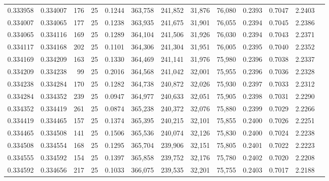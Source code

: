 \begin{tabular}{rrrrrrrrrrrrr}
0.333958 & 0.334007 &   176 &  25 &                                     0.1244 & 363,758 & 241,852 &  31,876 &  76,080 & 0.2393 & 0.7047 & 2.2403 \\
0.334007 & 0.334065 &   177 &  25 &                                     0.1238 & 363,935 & 241,675 &  31,901 &  76,055 & 0.2394 & 0.7045 & 2.2386 \\
0.334065 & 0.334116 &   169 &  25 &                                     0.1289 & 364,104 & 241,506 &  31,926 &  76,030 & 0.2394 & 0.7043 & 2.2371 \\
0.334117 & 0.334168 &   202 &  25 &                                     0.1101 & 364,306 & 241,304 &  31,951 &  76,005 & 0.2395 & 0.7040 & 2.2352 \\
0.334169 & 0.334209 &   163 &  25 &                                     0.1330 & 364,469 & 241,141 &  31,976 &  75,980 & 0.2396 & 0.7038 & 2.2337 \\
0.334209 & 0.334238 &    99 &  25 &                                     0.2016 & 364,568 & 241,042 &  32,001 &  75,955 & 0.2396 & 0.7036 & 2.2328 \\
0.334238 & 0.334284 &   170 &  25 &                                     0.1282 & 364,738 & 240,872 &  32,026 &  75,930 & 0.2397 & 0.7033 & 2.2312 \\
0.334284 & 0.334352 &   239 &  25 &                                     0.0947 & 364,977 & 240,633 &  32,051 &  75,905 & 0.2398 & 0.7031 & 2.2290 \\
0.334352 & 0.334419 &   261 &  25 &                                     0.0874 & 365,238 & 240,372 &  32,076 &  75,880 & 0.2399 & 0.7029 & 2.2266 \\
0.334419 & 0.334465 &   157 &  25 &                                     0.1374 & 365,395 & 240,215 &  32,101 &  75,855 & 0.2400 & 0.7026 & 2.2251 \\
0.334465 & 0.334508 &   141 &  25 &                                     0.1506 & 365,536 & 240,074 &  32,126 &  75,830 & 0.2400 & 0.7024 & 2.2238 \\
0.334508 & 0.334554 &   168 &  25 &                                     0.1295 & 365,704 & 239,906 &  32,151 &  75,805 & 0.2401 & 0.7022 & 2.2223 \\
0.334555 & 0.334592 &   154 &  25 &                                     0.1397 & 365,858 & 239,752 &  32,176 &  75,780 & 0.2402 & 0.7020 & 2.2208 \\
0.334592 & 0.334656 &   217 &  25 &                                     0.1033 & 366,075 & 239,535 &  32,201 &  75,755 & 0.2403 & 0.7017 & 2.2188 \\

\end{tabular}

